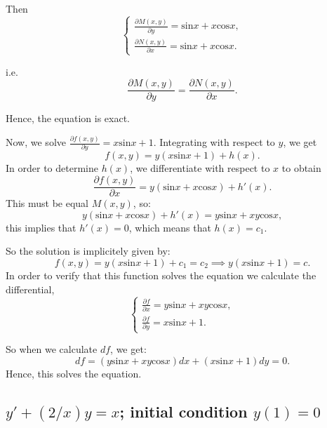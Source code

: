 \documentclass{article}
\begin{document}
		Then
		\begin{equation*}
			\begin{cases}
				\frac{\partial M(x,y)}{\partial y} = \text{sin}x + x\text{cos}x,
				\\
				\frac{\partial N(x,y)}{\partial x} = \text{sin}x + x\text{cos}x.
			\end{cases}
		\end{equation*}
		
		
	
		i.e. \[ \frac{\partial M(x,y)}{\partial y} = \frac{\partial N(x,y)}{\partial x}.\]

		Hence, the equation is exact.

		Now, we solve $\frac{\partial f(x,y)}{\partial y} = x\text{sin}x + 1$. 
		Integrating with respect to $y$, we get
		\[f(x,y) = y(x\text{sin}x +1) + h(x).\]
		In order to determine $h(x)$, we differentiate with
		respect to $x$ to obtain
		\[\frac{\partial f(x,y)}{\partial x} = y(\text{sin}x+x\text{cos}x) + h'(x).\]
		This must be equal $M(x,y)$, so:
		\[y(\text{sin}x+x\text{cos}x) + h'(x) = y\text{sin}x + xy\text{cos}x,\]
		this implies that $h'(x)=0$, which means that $h(x) = c_1$.
		
		So the solution is implicitely given by:
		\[ f(x,y) = y(x\text{sin}x +1) + c_1 = c_2 \implies y(x\text{sin}x +1) = c.\]
		In order to verify that this function solves the equation we calculate the differential,
		\begin{equation*}
			\begin{cases}
				\frac{\partial f}{\partial x} = y\text{sin}x + xy\text{cos}x,
				\\
				\frac{\partial f}{\partial y} = x\text{sin}x + 1.
			\end{cases}
		\end{equation*}

		
		So when we calculate $df$, we get:
		\[ df = (y\text{sin}x + xy\text{cos}x)dx + (x\text{sin}x + 1)dy =0.\]
		Hence, this solves the equation.
		
\subsection{$y' + (2/x)y = x$; initial condition $y(1)=0$}
\end{document}
